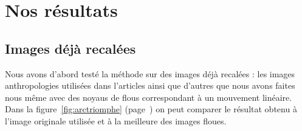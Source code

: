 \documentclass[a4paper,10pt]{report}
\begin{document}
\section{Nos résultats}

\subsection{Images déjà recalées}
Nous avons d'abord testé la méthode sur des images déjà recalées : 
les images anthropologies utilisées dans l'articles ainsi que d'autres que nous avons faites 
nous même avec des noyaus de flous correspondant à un mouvement linéaire. Dans la figure~\ref{fig:arctriomphe}
(page~\pageref{fig:arctriomphe}) on peut comparer le résultat obtenu à
l'image originale utilisée et à la meilleure des images floues.
\end{document}

